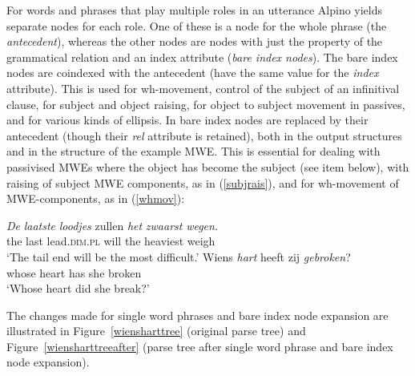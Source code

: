 \documentclass[output=paper,colorlinks,citecolor=brown]{langscibook}
\begin{document}
 For words and phrases that play multiple roles in an utterance Alpino yields separate nodes for each role. One of these is a node for the whole  phrase (the \textit{antecedent}), whereas the other nodes are nodes with just the property of the grammatical relation and an index attribute (\textit{bare index nodes}). The bare index nodes are coindexed with the antecedent (have the same value for the \textit{index} attribute). This is used for wh-movement, control of the subject of an infinitival clause, for subject and object raising, for object to subject movement in passives, and for various kinds of ellipsis. In {\mwefinder} bare index nodes are replaced by their antecedent (though their \textit{rel} attribute is retained), both in the {\supersetquery}  output structures and in the structure of the example MWE. This is essential for dealing with passivised MWEs where the object has become the subject (see item below), with raising of subject MWE components, as in (\ref{subjrais}), and for wh-movement of MWE-components, as in (\ref{whmov}): \
\begin{exe}
\ex
\begin{xlist}
\ex\label{subjrais} {\gll \textit{De} \textit{laatste} \textit{loodjes} zullen \textit{het} \textit{zwaarst} \textit{wegen}.\\
the last lead.\textsc{dim}.\textsc{pl} will the heaviest weigh\\}
\glt `The tail end will be the most difficult.' 
\ex\label{whmov} \gll Wiens \textit{hart} heeft zij \textit{gebroken}?\\
whose heart has she broken\\
\glt `Whose heart did she break?'

\end{xlist}
\end{exe}

The changes made for single word phrases and bare index node expansion are illustrated in Figure~\ref{wiensharttree} (original parse tree) and Figure~\ref{wiensharttreeafter} (parse tree after single word phrase and bare index node expansion).

\end{document}
